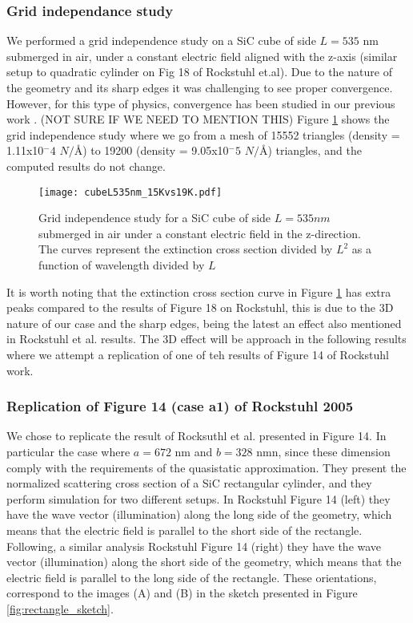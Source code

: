 \subsubsection{Grid independance study}

We performed a grid independence study on a SiC cube of side $L=535$ nm submerged in air, under a 
constant electric field aligned with the z-axis (similar setup to quadratic cylinder on Fig 18 of 
Rockstuhl et.al)\cite{rockstuhl2005}. 
Due to the nature of the geometry and its sharp edges it was challenging to see proper convergence. However,
for this type of physics, convergence has been studied in our previous work \cite{ClementiETal2019}. (NOT SURE IF WE NEED TO MENTION THIS)
Figure \ref{fig:cube535} shows the grid independence study where we go from a mesh of 15552 
triangles (density = 1.11x10$^-4$ $N/\text{\AA}$) to 19200 (density = 9.05x10$^-5$ $N/\text{\AA}$) 
triangles, and the computed results do not change.

\begin{figure}
    \centering
    \texttt{[image: cubeL535nm\_15Kvs19K.pdf]} 
    \caption{Grid independence study for a SiC cube of side $L=535 nm$ submerged in air under a constant 
    electric field in the z-direction. The curves represent the extinction cross section divided by $L^2$ 
    as a function of wavelength divided by $L$}
    \label{fig:cube535}
 \end{figure}

It is worth noting that the extinction cross section curve in Figure \ref{fig:cube535} has extra peaks 
compared to the results of Figure 18 on Rockstuhl, this is due to the 3D nature of our case and the sharp 
edges, being the latest an effect also mentioned in Rockstuhl et al. results. The 3D effect will be approach
in the following results where we attempt a replication of one of teh results of Figure 14 of Rockstuhl work. 

\subsubsection{Replication of Figure 14 (case a1) of Rockstuhl 2005}

We chose to replicate the result of Rocksuthl et al. presented in Figure 14. In particular the case where $a=672$ nm 
and $b=328$ nmn, since these dimension comply with the requirements of the quasistatic approximation.
They present the normalized scattering cross section of a SiC rectangular cylinder, and they perform simulation 
for two different setups. In Rockstuhl Figure 14 (left) they have the wave vector (illumination) along the long 
side of the geometry, which means that the electric field is parallel to the short side of the rectangle. Following, 
a similar analysis Rockstuhl Figure 14 (right) they have the wave vector (illumination) along the short
side of the geometry, which means that the electric field is parallel to the long side of the rectangle. These orientations,
correspond to the images (A) and (B) in the sketch presented in Figure \ref{fig:rectangle_sketch}.

